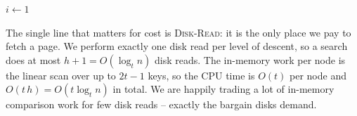 \begin{algorithm}[H]
\caption{\textsc{B-Tree-Search}$(x, k)$ -- find key $k$ in the subtree rooted at $x$}
$i \gets 1$\;
\end{algorithm}

The single line that matters for cost is \textsc{Disk-Read}: it is the only place
we pay to fetch a page. We perform exactly one disk read per level of descent, so a
search does at most $h + 1 = O(\log_t n)$ disk reads. The in-memory work per node
is the linear scan over up to $2t-1$ keys, so the CPU time is $O(t)$ per node and
$O(t\,h) = O(t \log_t n)$ in total. We are happily trading a lot of in-memory
comparison work for few disk reads -- exactly the bargain disks demand.


